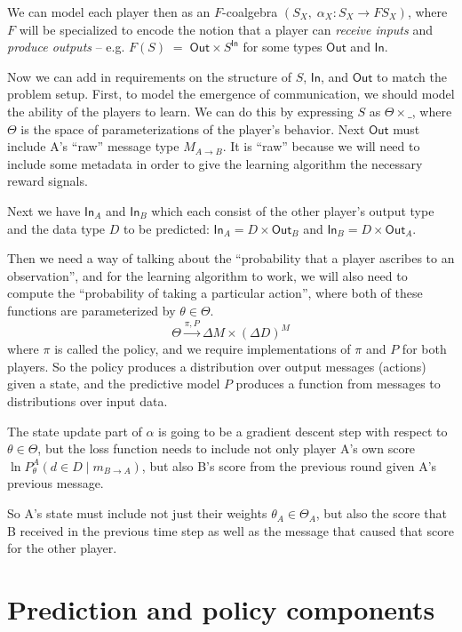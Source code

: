 \documentclass{article}
\theoremstyle{definition}
\begin{document}
We can model each player then as an $F$-coalgebra 
$(S_X,\;\alpha_X\colon S_X\longrightarrow F S_X)$, where $F$ will be specialized to encode the notion that a player can \emph{receive inputs} and \emph{produce outputs} -- e.g. $F(S)\;=\;\mathsf{Out}\times S^{\mathsf{In}}$ for some types $\mathsf{Out}$ and $\mathsf{In}$.

Now we can add in requirements on the structure of $S$, $\mathsf{In}$, and $\mathsf{Out}$ to match the problem setup. First, to model the emergence of communication, we should model the ability of the players to learn. We can do this by expressing $S$ as $\Theta \times \_$, where $\Theta$ is the space of parameterizations of the player's behavior. Next $\mathsf{Out}$ must include A's ``raw'' message type $M_{A\rightarrow B}$. It is ``raw'' because we will need to include some metadata in order to give the learning algorithm the necessary reward signals. 

Next we have $\mathsf{In}_A$ and $\mathsf{In}_B$ which each consist of the other player's output type and the data type $D$ to be predicted: $\mathsf{In}_A=D \times \mathsf{Out}_B$ and $\mathsf{In}_B=D \times \mathsf{Out}_A$.

Then we need a way of talking about the ``probability that a player ascribes to an observation'', and for the learning algorithm to work, we will also need to compute the ``probability of taking a particular action'', where both of these functions are parameterized by $\theta \in \Theta$.
$$
\Theta \xrightarrow{\pi, P} \Delta M \times (\Delta D)^M
$$ where $\pi$ is called the policy, and we require implementations of $\pi$ and $P$ for both players. So the policy produces a distribution over output messages (actions) given a state, and the predictive model $P$ produces a function from messages to distributions over input data.

The state update part of $\alpha$ is going to be a gradient descent step with respect to $\theta \in \Theta$, but the loss function needs to include not only player A's own score $\ln P_\theta^A(d \in D \mid m_{B \rightarrow A})$, but also B's score from the previous round given A's previous message.

So A's state must include not just their weights $\theta_A \in \Theta_A$, but also the score that B received in the previous time step as well as the message that caused that score for the other player.
\section{Prediction and policy components}
\end{document}
